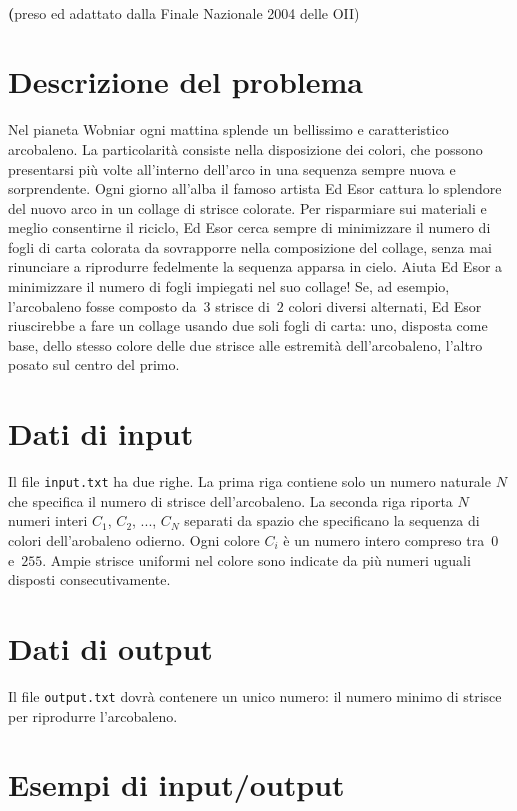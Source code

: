 \documentclass[a4paper,11pt]{article}
\begin{document}
\\
{\large \textbf (preso ed adattato dalla Finale Nazionale 2004 delle OII)}


\section*{Descrizione del problema}
  Nel pianeta Wobniar ogni mattina splende un bellissimo e caratteristico
arcobaleno. La particolarità consiste nella disposizione dei colori, che
possono presentarsi più volte all'interno dell'arco in una sequenza sempre nuova e sorprendente.
Ogni giorno all'alba il famoso artista Ed Esor
cattura lo splendore del nuovo arco in un collage di strisce colorate.
Per risparmiare sui materiali e meglio consentirne il riciclo,
Ed Esor cerca sempre di minimizzare
il numero di fogli di carta colorata da sovrapporre nella composizione
del collage, senza mai rinunciare a riprodurre fedelmente la sequenza
apparsa in cielo.
Aiuta Ed Esor a minimizzare il numero di fogli impiegati nel suo collage!
Se, ad esempio, l'arcobaleno fosse composto da~$3$ strisce di~$2$
colori diversi alternati, Ed Esor riuscirebbe a fare un collage usando
due soli fogli di carta: uno, disposta come base, dello stesso
colore delle due strisce alle estremità dell'arcobaleno, l'altro
posato sul centro del primo.

\section*{Dati di input}
  Il file \texttt{input.txt} ha due righe.
  La prima riga contiene solo un numero naturale $N$
  che specifica il numero di strisce dell'arcobaleno.
  La seconda riga riporta $N$ numeri interi $C_{1}$, $C_{2}$, ..., $C_{N}$
separati da spazio che specificano la sequenza di colori dell'arobaleno odierno.
Ogni colore $C_{i}$ è un numero
intero compreso tra~$0$ e~$255$.
Ampie strisce uniformi nel colore sono indicate da più numeri uguali disposti consecutivamente.

\section*{Dati di output}
  Il file \texttt{output.txt} dovrà contenere un
unico numero: il numero minimo di strisce per riprodurre l'arcobaleno.

\section*{Esempi di input/output}
\end{document}
